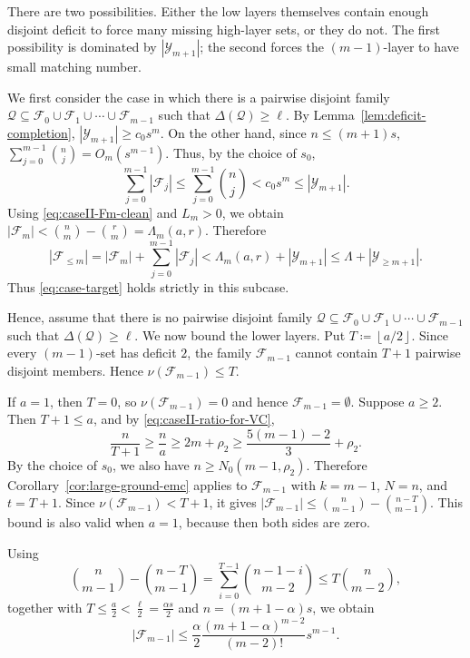 \documentclass[10pt,a4paper]{article}
\numberwithin{equation}{section}
\theoremstyle{definition}
\newcommand{\F}{\mathcal F}
\newcommand{\Y}{\mathcal Y}
\begin{document}
There are two possibilities.  Either the low layers themselves contain enough
disjoint deficit to force many missing high-layer sets, or they do not.  The
first possibility is dominated by $|\Y_{m+1}|$; the second forces
the $(m-1)$-layer to have small matching number.

We first consider the case in which there is a pairwise disjoint family
\(\mathcal Q\subseteq \F_0\cup\F_1\cup\cdots\cup\F_{m-1}\)
such that $\Delta(\mathcal Q)\ge\ell$.
By Lemma~\ref{lem:deficit-completion}, $|\Y_{m+1}|\ge c_0s^m$.
On the other hand, since \(n\le(m+1)s\),
\(\sum_{j=0}^{m-1}\binom nj=O_m(s^{m-1}).\)
Thus, by the choice of \(s_0\),
\[
    \sum_{j=0}^{m-1}|\F_j|
    \le
    \sum_{j=0}^{m-1}\binom nj
    <
    c_0s^m
    \le
    |\Y_{m+1}|.
\]
Using \eqref{eq:caseII-Fm-clean} and \(L_m>0\), we obtain
\(|\F_m| < \binom nm-\binom rm = \Lambda_m(a,r).\)
Therefore
\[
    |\F_{\le m}|
    =
    |\F_m|+\sum_{j=0}^{m-1}|\F_j|
    <
    \Lambda_m(a,r)+|\Y_{m+1}|
    \le
    \Lambda+|\Y_{\ge m+1}|.
\]
Thus \eqref{eq:case-target} holds strictly in this subcase.

Hence, assume that there is no pairwise disjoint family
\(\mathcal Q\subseteq \F_0\cup\F_1\cup\cdots\cup\F_{m-1}\)
such that $\Delta(\mathcal Q)\ge \ell$.
We now bound the lower layers.  Put $T\coloneqq \left\lfloor a/2\right\rfloor$.
Since every \((m-1)\)-set has deficit \(2\), the family \(\F_{m-1}\) cannot
contain \(T+1\) pairwise disjoint members.
Hence $\nu(\F_{m-1})\le T$.

If \(a=1\), then \(T=0\), so
\(\nu(\F_{m-1})=0\) and hence \(\F_{m-1}=\emptyset\).  Suppose \(a\ge2\).
Then \(T+1\le a\), and by \eqref{eq:caseII-ratio-for-VC},
\[
    \frac n{T+1}
    \ge
    \frac na
    \ge
    2m+\rho_2
    \ge
    \frac{5(m-1)-2}{3}+\rho_2.
\]
By the choice of \(s_0\), we also have \(n\ge N_0(m-1,\rho_2)\).  Therefore
Corollary~\ref{cor:large-ground-emc} applies to \(\F_{m-1}\) with
\(k=m-1\), \(N=n\), and \(t=T+1\).  Since
\(\nu(\F_{m-1})<T+1\), it gives
\(|\F_{m-1}| \le \binom n{m-1}-\binom{n-T}{m-1}.\)
This bound is also valid when \(a=1\), because then both sides are zero.

Using
\[
    \binom n{m-1}-\binom{n-T}{m-1}
    =
    \sum_{i=0}^{T-1}\binom{n-1-i}{m-2}
    \le
    T\binom n{m-2},
\]
together with
\(T\le \frac a2<\frac{\ell}{2}=\frac{\alpha s}{2}\) and \(n=(m+1-\alpha)s\),
we obtain
\begin{equation}\label{eq:caseII-Fm1-main-clean}
    |\F_{m-1}|
    \le
    \frac{\alpha}{2}
    \frac{(m+1-\alpha)^{m-2}}{(m-2)!}
    s^{m-1}.
\end{equation}
\end{document}
